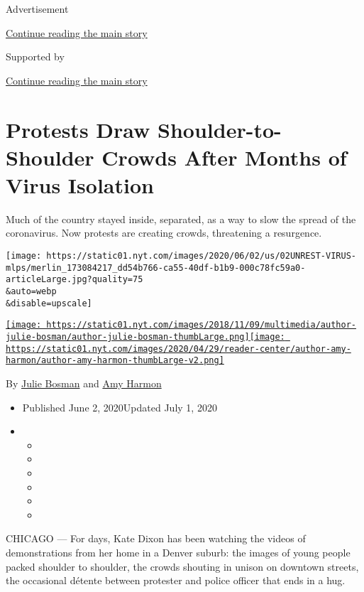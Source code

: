 Advertisement

\protect\hyperlink{after-top}{Continue reading the main story}

Supported by

\protect\hyperlink{after-sponsor}{Continue reading the main story}

\hypertarget{protests-draw-shoulder-to-shoulder-crowds-after-months-of-virus-isolation}{%
\section{Protests Draw Shoulder-to-Shoulder Crowds After Months of Virus
Isolation}\label{protests-draw-shoulder-to-shoulder-crowds-after-months-of-virus-isolation}}

Much of the country stayed inside, separated, as a way to slow the
spread of the coronavirus. Now protests are creating crowds, threatening
a resurgence.

\texttt{[image: https://static01.nyt.com/images/2020/06/02/us/02UNREST-VIRUS-mlps/merlin\_173084217\_dd54b766-ca55-40df-b1b9-000c78fc59a0-articleLarge.jpg?quality=75\\\&auto=webp\\\&disable=upscale]}

\href{https://www.nytimes.com/by/julie-bosman}{\texttt{[image: https://static01.nyt.com/images/2018/11/09/multimedia/author-julie-bosman/author-julie-bosman-thumbLarge.png]}}\href{https://www.nytimes.com/by/amy-harmon}{\texttt{[image: https://static01.nyt.com/images/2020/04/29/reader-center/author-amy-harmon/author-amy-harmon-thumbLarge-v2.png]}}

By \href{https://www.nytimes.com/by/julie-bosman}{Julie Bosman} and
\href{https://www.nytimes.com/by/amy-harmon}{Amy Harmon}

\begin{itemize}
\item
  Published June 2, 2020Updated July 1, 2020
\item
  \begin{itemize}
  \item
  \item
  \item
  \item
  \item
  \item
  \end{itemize}
\end{itemize}

CHICAGO --- For days, Kate Dixon has been watching the videos of
demonstrations from her home in a Denver suburb: the images of young
people packed shoulder to shoulder, the crowds shouting in unison on
downtown streets, the occasional détente between protester and police
officer that ends in a hug.

